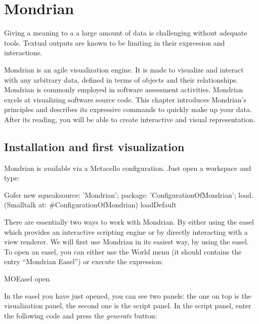 \documentclass[a4paper,10pt,twoside]{book}
\begin{document}
\fi
\sloppy
\chapter{Mondrian}


Giving a meaning to a a large amount of data is challenging without adequate tools. Textual outputs are known to be limiting in their expression and interactions. 

Mondrian is an agile visualization engine. It is made to visualize and interact with any arbitrary data, defined in terms of objects and their relationships. Mondrian is commonly employed in software assessment activities. Mondrian excels at visualizing software source code. This chapter introduces Mondrian's principles and describes its expressive commands to quickly make up your data. After its reading, you will be able to create interactive and visual representation.


\section{Installation and first visualization}

Mondrian is available via a Metacello configuration. Just open a workspace and type:

\begin{code}{}
Gofer new
	squeaksource: 'Mondrian'; 
	package: 'ConfigurationOfMondrian';
	load.
(Smalltalk at: #ConfigurationOfMondrian) loadDefault
\end{code}

There are essentially two ways to work with Mondrian. By either using the easel which provides an interactive scripting engine or by directly interacting with a view renderer. We will first use Mondrian in its easiest way, by using the easel. To open an easel, you can either use the World menu (it should contains the entry ``Mondrian Easel'') or execute the expression:

\begin{code}{}
MOEasel open.
\end{code}

In the easel you have just opened, you can see two panels: the one on top is the visualization panel, the second one is the script panel. In the script panel, enter the following code and press the \emph{generate} button:
\end{document}
